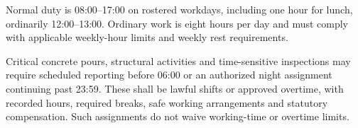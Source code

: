 Normal duty is 08:00--17:00 on rostered workdays, including one hour for lunch,
ordinarily 12:00--13:00. Ordinary work is eight hours per day and must comply with
applicable weekly-hour limits and weekly rest requirements.

Critical concrete pours, structural activities and time-sensitive inspections may
require scheduled reporting before 06:00 or an authorized night assignment continuing
past 23:59. These shall be lawful shifts or approved overtime, with recorded hours,
required breaks, safe working arrangements and statutory compensation.
Such assignments do not waive working-time or overtime limits.
